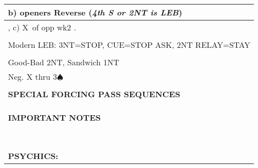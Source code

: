 \documentclass{article}
\renewcommand\S{\ensuremath{\spadesuit}}
\newcommand\X{{\footnotesize X}}
\begin{document}
\begin{minipage}{90mm}
\begin{tabular}{| p{88mm} |}
          \\  \hline b) openers Reverse (\textit{4th S or 2NT is LEB})
                \\ \hline, c) \X\ of opp wk2 . 
		\\ \hline
		\\ \hline
                 Modern LEB: 3NT=STOP, CUE=STOP ASK, 2NT RELAY=STAY
		\\ \hline
                \\ Good-Bad 2NT, Sandwich 1NT
		\\ \hline
                Neg. X thru 3\S\
		\\ \hline
		\\ \hline
		\textbf{SPECIAL FORCING PASS SEQUENCES} \\ \hline
		\\ \hline
		\\ \hline
		\\ \hline
		\textbf{IMPORTANT NOTES} \\ \hline
		\\ \hline
		\\ \hline
		\\ \hline
		\\ \hline
		\\ \hline
		\\ \hline
		\\ \hline
		\\ \hline
		\textbf{PSYCHICS:} \\ \hline
	\end{tabular}
\end{minipage}
\end{document}
